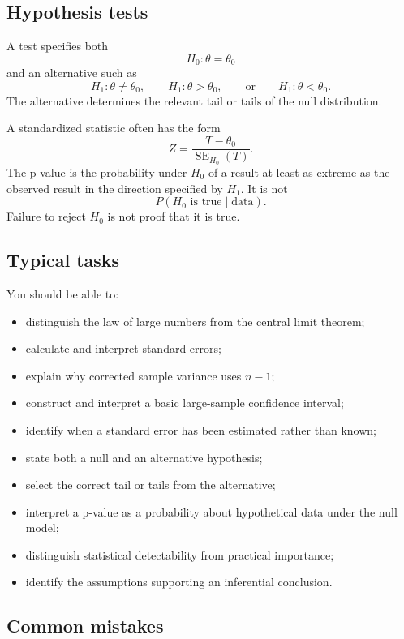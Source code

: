 \subsection*{Hypothesis tests}

A test specifies both
\[
H_0:\theta=\theta_0
\]
and an alternative such as
\[
H_1:\theta\neq\theta_0,
\qquad
H_1:\theta>\theta_0,
\qquad\text{or}\qquad
H_1:\theta<\theta_0.
\]
The alternative determines the relevant tail or tails of the null distribution.

A standardized statistic often has the form
\[
Z=\frac{T-\theta_0}{\operatorname{SE}_{H_0}(T)}.
\]
The p-value is the probability under \(H_0\) of a result at least as extreme as
the observed result in the direction specified by \(H_1\). It is not
\[
P(H_0\text{ is true}\mid\text{data}).
\]
Failure to reject \(H_0\) is not proof that it is true.

\subsection*{Typical tasks}

You should be able to:
\begin{itemize}
    \item distinguish the law of large numbers from the central limit theorem;
    \item calculate and interpret standard errors;
    \item explain why corrected sample variance uses \(n-1\);
    \item construct and interpret a basic large-sample confidence interval;
    \item identify when a standard error has been estimated rather than known;
    \item state both a null and an alternative hypothesis;
    \item select the correct tail or tails from the alternative;
    \item interpret a p-value as a probability about hypothetical data under the
    null model;
    \item distinguish statistical detectability from practical importance;
    \item identify the assumptions supporting an inferential conclusion.
\end{itemize}

\subsection*{Common mistakes}

